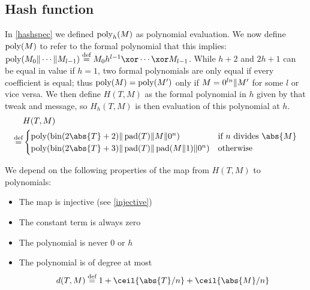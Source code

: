 \documentclass[hctr.tex]{subfiles}
\begin{document}
\subsection{Hash function}\label{hproperties}
In \autoref{hashspec} we defined \(\operatorname{poly}_h(M)\) as polynomial evaluation.
We now define \(\operatorname{poly}(M)\) to refer to the formal polynomial
that this implies: \(\poly(M_0 \Concat \cdots \Concat M_{l-1})
\defeq  M_0h^{l-1} \xor \cdots \xor M_{l-1}\).
While \(h + 2\) and \(2h + 1\) can be equal
in value if \(h = 1\), two formal polynomials are only equal
if every coefficient is equal; thus \(\operatorname{poly}(M) = \operatorname{poly}(M')\)
only if \(M = 0^{ln} \Vert M'\) for some \(l\) or vice versa.
We then define \(H(T, M)\) as the formal polynomial in \(h\) given
by that tweak and message,
so \(H_h(T, M)\) is then evaluation of this polynomial at \(h\).
\begin{align*}
    & H(T, M) \\
    \defeq &
    \begin{cases}
        \poly(\fromint(2\abs{T} + 2) \Concat \pad(T) \Concat M \Concat 0^n) &
        \text{if } n \text{ divides } \abs{M} \\
        \poly(\fromint(2\abs{T} + 3) \Concat \pad(T) \Concat \pad(M \Concat 1) \Concat 0^n) &
        \text{otherwise}
    \end{cases}    \\
\end{align*}

We depend on the following properties of the map from 
\(H(T, M)\) to polynomials:
\begin{itemize}
    \item The map is injective (see \autoref{injective})
    \item The constant term is always zero
    \item The polynomial is never \(0\) or \(h\)
    \item The polynomial is of degree at most
    \begin{displaymath}
        d(T, M) \defeq 1 + \ceil{\abs{T}/n} + \ceil{\abs{M}/n}
    \end{displaymath}
\end{itemize}
\end{document}
